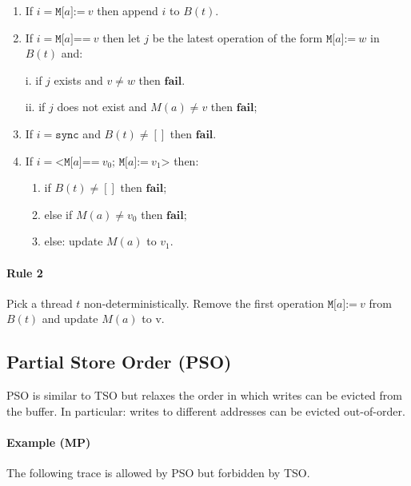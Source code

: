 \documentclass[11pt]{article}
\begin{document}
\begin{enumerate}
\item 
     If $i = \texttt{M[}a\texttt{]:=}~v$ then append $i$ to $B(t)$.

\item 
     If $i = \texttt{M[}a\texttt{]==}~v$ then let $j$ be the latest
     operation of the form $\texttt{M[}a\texttt{]:=}~w$ in
     $B(t)$ and:
     
       i.   if $j$ exists and $v \neq w$ then $\textbf{fail}$.

       ii.  if $j$ does not exist and $M(a) \neq v$ then $\textbf{fail}$;

\item 
     If $i = \texttt{sync}$ and $B(t) \neq []$ then $\textbf{fail}$.

\item
     If $i = \texttt{<M[}a\texttt{]==}~v_0\texttt{; M[}a\texttt{]:=}~v_1
     \texttt{>}$ then:

\begin{enumerate}[i]
\item
           if $B(t) \neq []$ then $\textbf{fail}$;

\item
           else if $M(a) \neq v_0$ then $\textbf{fail}$;

\item
           else: update $M(a)$ to $v_1$.
\end{enumerate}
\end{enumerate}

\paragraph{Rule 2}

Pick a thread $t$ non-deterministically. Remove the first operation
$\texttt{M[}a\texttt{]:=}~v$ from $B(t)$ and update $M(a)$ to v.

\subsection{Partial Store Order (PSO)}

PSO is similar to TSO but relaxes the order in which writes can be
evicted from the buffer.  In particular: writes to different addresses
can be evicted out-of-order.

\paragraph{Example (MP)} The following trace is allowed by PSO but
forbidden by TSO.
\end{document}
